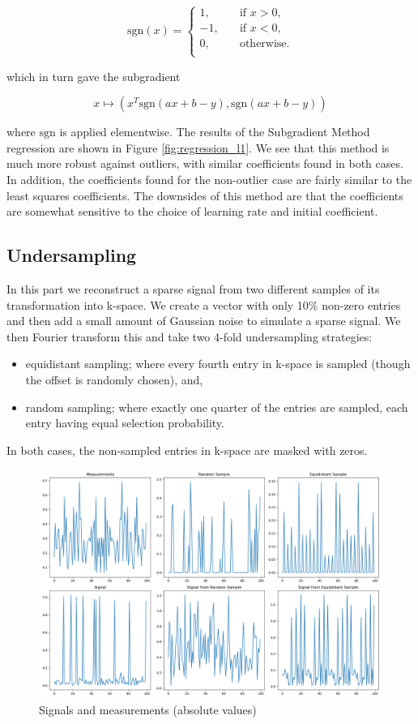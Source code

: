 \documentclass[12pt]{article}
\begin{document}
\[
\text{sgn}(x) =
\begin{cases}
    1,   &\quad\text{if }x>0,\\
    -1,  &\quad\text{if }x<0,\\
    0,   &\quad\text{otherwise.}\\
\end{cases}
\]

which in turn gave the subgradient

\[x\mapsto(x^T\text{sgn}(ax+b-y), \text{sgn}(ax+b-y))\]

where $\text{sgn}$ is applied elementwise.
The results of the Subgradient Method regression are shown in Figure \ref{fig:regression_l1}.
We see that this method is much more robust against outliers, with similar coefficients found in both cases.
In addition, the coefficients found for the non-outlier case are fairly similar to the least squares coefficients.
The downsides of this method are that the coefficients are somewhat sensitive to the choice of learning rate and initial coefficient.

\subsection{Undersampling} \label{section:undersampling}

In this part we reconstruct a sparse signal from two different samples of its transformation into k-space.
We create a vector with only 10\% non-zero entries and then add a small amount of Gaussian noise to simulate a sparse signal.
We then Fourier transform this and take two 4-fold undersampling strategies:
\begin{itemize}
    \item equidistant sampling; where every fourth entry in k-space is sampled (though the offset is randomly chosen), and,
    \item random sampling; where exactly one quarter of the entries are sampled, each entry having equal selection probability.
\end{itemize}
In both cases, the non-sampled entries in k-space are masked with zeros.

\begin{figure}[htp]
    \includegraphics[scale=0.36, center]{figures/signal.png}
    \caption{Signals and measurements (absolute values)}
    \label{fig:signal}
\end{figure}
\end{document}
